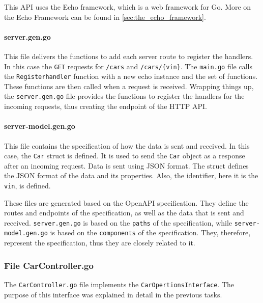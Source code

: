 This API uses the Echo framework, which is a web framework for Go.
More on the Echo Framework can be found in \autoref{sec:the_echo_framework}.

\paragraph*{server.gen.go}
This file delivers the functions to add each server route to register the handlers.
In this case the \texttt{GET} requests for \texttt{/cars} and \texttt{/cars/\{vin\}}.
The \texttt{main.go} file calls the \texttt{Registerhandler} function with a new echo instance and the set of functions.
These functions are then called when a request is received.
Wrapping things up, the \texttt{server.gen.go} file provides the functions to register the handlers for the incoming requests, thus creating the endpoint of the HTTP API.

\paragraph*{server-model.gen.go}
This file contains the specification of how the data is sent and received.
In this case, the \texttt{Car} struct is defined.
It is used to send the \texttt{Car} object as a response after an incoming request.
Data is sent using JSON format.
The struct defines the JSON format of the data and its properties.
Also, the identifier, here it is the \texttt{vin}, is defined.

These files are generated based on the OpenAPI specification.
They define the routes and endpoints of the specification, as well as the data that is sent and received.
\texttt{server.gen.go} is based on the \texttt{paths} of the specification, while \texttt{server-model.gen.go} is based on the \texttt{components} of the specification.
They, therefore, represent the specification, thus they are closely related to it.

\subsubsection*{File CarController.go}
The \texttt{CarController.go} file implements the \texttt{CarOpertionsInterface}.
The purpose of this interface was explained in detail in the previous tasks.

